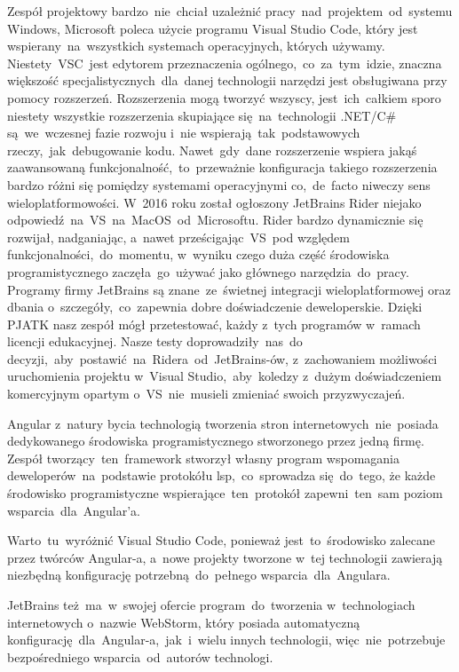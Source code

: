 \indent Zespół projektowy bardzo~nie~chciał uzależnić pracy~nad~projektem~od~systemu Windows, Microsoft poleca użycie programu Visual Studio Code, który jest wspierany~na~wszystkich systemach operacyjnych, których używamy.
Niestety~VSC~jest edytorem przeznaczenia ogólnego,~co~za~tym~idzie, znaczna większość specjalistycznych~dla~danej technologii narzędzi jest obsługiwana przy pomocy rozszerzeń.
Rozszerzenia mogą tworzyć wszyscy, jest~ich~całkiem sporo niestety wszystkie rozszerzenia skupiające się~na~technologii .NET/C\# są~we~wczesnej fazie rozwoju i~nie wspierają~tak~podstawowych rzeczy,~jak~debugowanie kodu.
Nawet~gdy~dane rozszerzenie wspiera jakąś zaawansowaną funkcjonalność,~to~przeważnie konfiguracja takiego rozszerzenia bardzo różni się pomiędzy systemami operacyjnymi co,~de~facto niweczy sens wieloplatformowości.
\indent W~2016 roku został ogłoszony JetBrains Rider niejako odpowiedź~na~VS~na~MacOS~od~Microsoftu.
Rider bardzo dynamicznie się rozwijał, nadganiając, a~nawet prześcigając~VS~pod względem funkcjonalności,~do~momentu, w~wyniku czego duża część środowiska programistycznego zaczęła~go~używać jako głównego narzędzia~do~pracy.
Programy firmy JetBrains są znane~ze~świetnej integracji wieloplatformowej oraz dbania o~szczegóły,~co~zapewnia dobre doświadczenie deweloperskie.
\indent Dzięki PJATK nasz zespół mógł przetestować, każdy z~tych programów w~ramach licencji edukacyjnej.
Nasze testy doprowadziły~nas~do decyzji,~aby~postawić~na~Ridera~od~JetBrains-ów, z~zachowaniem możliwości uruchomienia projektu w~Visual Studio,~aby~koledzy z~dużym doświadczeniem komercyjnym opartym o~VS~nie~musieli zmieniać swoich przyzwyczajeń.

\indent Angular z~natury bycia technologią tworzenia stron internetowych~nie~posiada dedykowanego środowiska programistycznego stworzonego przez jedną firmę.
Zespół tworzący~ten~framework stworzył własny program wspomagania deweloperów~na~podstawie protokółu \acrshort{lsp},~co~sprowadza się~do~tego, że każde środowisko programistyczne wspierające~ten~protokół zapewni~ten~sam poziom wsparcia~dla~Angular'a.

\indent Warto~tu~wyróżnić Visual Studio Code, ponieważ jest~to~środowisko zalecane przez twórców Angular-a, a~nowe projekty tworzone w~tej technologii zawierają niezbędną konfigurację potrzebną~do~pełnego wsparcia~dla~Angulara. \newline

JetBrains też~ma~w~swojej ofercie program~do~tworzenia w~technologiach internetowych o~nazwie WebStorm, który posiada automatyczną konfigurację~dla~Angular-a,~jak~i~wielu innych technologii, więc~nie~potrzebuje bezpośredniego wsparcia~od~autorów technologi.

